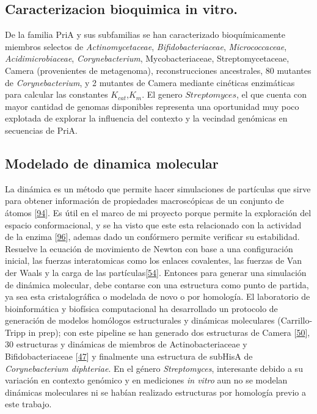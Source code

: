 \documentclass[12pt,twoside]{reedthesis}
\begin{document}
  \subsection{Caracterizacion bioquimica in
  vitro.}\label{caracterizacion-bioquimica-in-vitro.}
  
  De la familia PriA y sus subfamilias se han caracterizado
  bioquímicamente miembros selectos de \emph{Actinomycetaceae},
  \emph{Bifidobacteriaceae}, \emph{Micrococcaceae},
  \emph{Acidimicrobiaceae}, \emph{Corynebacterium}, Mycobacteriaceae,
  Streptomycetaceae, Camera (provenientes de metagenoma), reconstrucciones
  ancestrales, 80 mutantes de \emph{Corynebacterium}, y 2 mutantes de
  Camera mediante cinéticas enzimáticas para calcular las constantes
  \(K_{cat}\),\(K_m\). El genero \(Streptomyces\), el que cuenta con mayor
  cantidad de genomas disponibles representa una oportunidad muy poco
  explotada de explorar la influencia del contexto y la vecindad genómicas
  en secuencias de PriA.
  
  \subsection{Modelado de dinamica
  molecular}\label{modelado-de-dinamica-molecular}
  
  La dinámica es un método que permite hacer simulaciones de partículas
  que sirve para obtener información de propiedades macroscópicas de un
  conjunto de átomos
  {[}\protect\hyperlink{ref-petrenko_molecular_2001}{94}{]}. Es útil en el
  marco de mi proyecto porque permite la exploración del espacio
  conformacional, y se ha visto que este esta relacionado con la actividad
  de la enzima {[}\protect\hyperlink{ref-sikosek_biophysics_2014}{96}{]},
  ademas dado un confórmero permite verificar su estabilidad. Resuelve la
  ecuación de movimiento de Newton con base a una configuración inicial,
  las fuerzas interatomicas como los enlaces covalentes, las fuerzas de
  Van der Waals y la carga de las
  partículas{[}\protect\hyperlink{ref-campbell_biophysical_2012}{54}{]}.
  Entonces para generar una simulación de dinámica molecular, debe
  contarse con una estructura como punto de partida, ya sea esta
  cristalográfica o modelada de novo o por homología. El laboratorio de
  bioinformática y biofísica computacional ha desarrollado un protocolo de
  generación de modelos homólogos estructurales y dinámicas moleculares
  (Carrillo-Tripp in prep); con este pipeline se han generado dos
  estructuras de Camera
  {[}\protect\hyperlink{ref-noda-garcia_insights_2015}{50}{]}, 30
  estructuras y dinámicas de miembros de Actinobacteriaceae y
  Bifidobacteriaceae
  {[}\protect\hyperlink{ref-juarez-vazquez_evolution_2017}{47}{]} y
  finalmente una estructura de subHisA de \emph{Corynebacterium
  diphteriae}. En el género \emph{Streptomyces}, interesante debido a su
  variación en contexto genómico y en mediciones \emph{in vitro} aun no se
  modelan dinámicas moleculares ni se habían realizado estructuras por
  homología previo a este trabajo.
  
\end{document}
